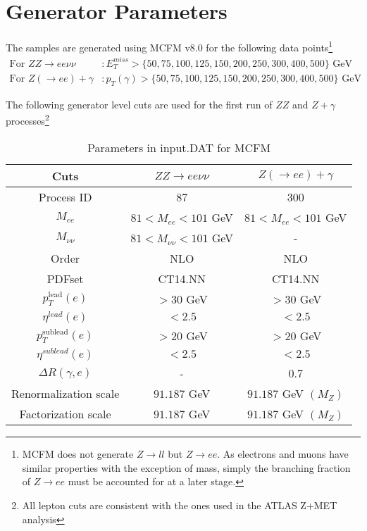 \documentclass[11pt,a4paper,final]{report}
\begin{document}
\section{Generator Parameters}
The samples are generated using MCFM v8.0 for the following data points\footnote{MCFM does not generate $Z\rightarrow ll$ but $Z\rightarrow ee$. As electrons and muons have similar properties with the exception of mass, simply the branching fraction of $Z\rightarrow ee$ must be accounted for at a later stage.}
\begin{align*}
	\text{For } ZZ \rightarrow ee\nu\nu &: E_T^{miss} > \{50,75,100,125,150,200,250,300,400,500\}\text{ GeV} \\
	\text{For } Z(\rightarrow ee)+\gamma &: p_T(\gamma) > \{50,75,100,125,150,200,250,300,400,500\}\text{ GeV}
\end{align*}

The following generator level cuts are used for the first run of $ZZ$ and $Z+\gamma$ processes\footnote{All lepton cuts are consistent with the ones used in the ATLAS Z+MET analysis}
\begin{table}[H]
\begin{center}
	\begin{tabular}{|c|c|c|}
	\hline
	\textbf{Cuts} &$ZZ \rightarrow ee\nu\nu$ & $Z(\rightarrow ee)+\gamma$\\
	\hline
	Process ID & 87 & 300\\
	$M_{ee}$ & $81 < M_{ee} < 101$ GeV & $81 < M_{ee} < 101$ GeV\\
	$M_{\nu\nu}$ & $81 < M_{\nu\nu} < 101$ GeV& -\\
	Order & NLO & NLO\\
	PDFset & CT14.NN & CT14.NN\\
	$p_T^{\text{lead}}(e)$ & $> 30$ GeV & $> 30$ GeV\\
	$\eta^{lead}(e)$ & $< 2.5$ & $< 2.5$\\
	$p_T^{\text{sublead}}(e)$ & $> 20$ GeV & $> 20$ GeV\\
	$\eta^{sublead}(e)$ & $< 2.5$ & $< 2.5$\\
	$\Delta R(\gamma,e)$ & - & 0.7\\
	Renormalization scale & $91.187$ GeV & $91.187$ GeV $(M_{Z})$\\
	Factorization scale & $91.187$ GeV & $91.187$ GeV $(M_{Z})$\\
	\hline
	\end{tabular}
	\caption{Parameters in input.DAT for MCFM}
	\label{table:default}
	\end{center}
\end{table}
\end{document}
